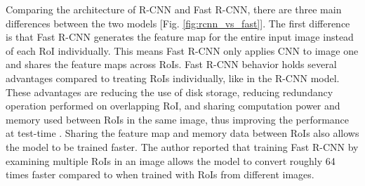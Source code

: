 Comparing the architecture of R-CNN and Fast R-CNN, there are three main differences between the two models [Fig. \ref{fig:rcnn_vs_fast}]. The first difference is that Fast R-CNN generates the feature map for the entire input image instead of each RoI individually. This means Fast R-CNN only applies CNN to image one and shares the feature maps across RoIs. Fast R-CNN behavior holds several advantages compared to treating RoIs individually, like in the R-CNN model. These advantages are reducing the use of disk storage, reducing redundancy operation performed on overlapping RoI, and sharing computation power and memory used between RoIs in the same image, thus improving the performance at test-time \cite{fast_rcnn_og}. Sharing the feature map and memory data between RoIs also allows the model to be trained faster. The author reported that training Fast R-CNN by examining multiple RoIs in an image allows the model to convert roughly 64 times faster compared to when trained with RoIs from different images. 

